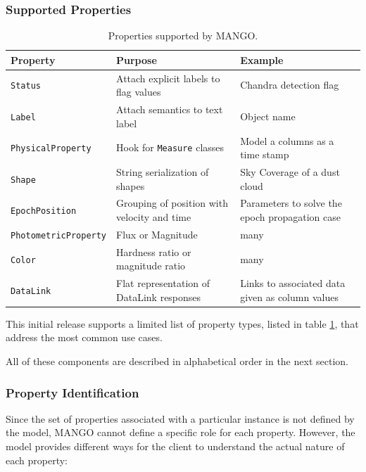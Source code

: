 \documentclass[11pt,a4paper]{ivoa}
\begin{document}
      \subsubsection{Supported Properties}

\begin{table}[h!]
\small
\begin{center}
\begin{tabular}{|| p{3.5cm} | p{3.5cm} |  p{3.5cm} ||} 
 \hline\hline
 \textbf{Property} & \textbf{Purpose} & \textbf{Example} \\ 
  \hline\hline
 \texttt{Status} & Attach explicit labels to flag values & Chandra detection flag  \\ 
 \hline
 \texttt{Label} & Attach semantics to text label & Object name \\
 \hline
 \texttt{PhysicalProperty} & Hook for \texttt{Measure} classes & Model a columns as a time stamp \\
 \hline
 \texttt{Shape} & String serialization of shapes & Sky Coverage of a dust cloud \\
 \hline
 \texttt{EpochPosition} & Grouping of position with velocity and time & Parameters to solve the epoch propagation case\\  
 \hline
 \texttt{PhotometricProperty} & Flux or Magnitude & many \\ 
 \hline
 \texttt{Color} & Hardness ratio or magnitude ratio & many  \\ [1ex] 
 \hline
 \texttt{DataLink} & Flat representation of DataLink responses & Links to associated data given as column values\\ [1ex] 
 \hline
\end{tabular}
\caption{Properties supported by MANGO.}
\label{table:properties}
\end{center}
 \end{table}
This initial release supports a limited list of property types, listed in table \ref{table:properties}, that address the most common use cases.

All of these components are described in alphabetical order in the next section. 


\subsubsection{Property Identification}
Since the set of properties associated with a particular instance is not defined by the model,
MANGO cannot define a specific role for each property. However, the model provides different ways
for the client to understand the actual nature of each property:
\end{document}
